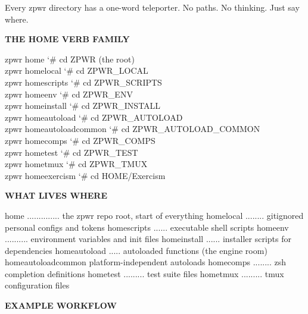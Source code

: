 \documentclass[11pt,a4paper,twoside]{book}
\begin{document}
Every zpwr directory has a one-word teleporter. No paths. No thinking. Just say where.


\vspace{12pt}
{\bfseries\color{neonyellow} THE \textbf{HOME} VERB FAMILY}\vspace{4pt}

\begin{codebox}
\color{neongreen}zpwr home                {\char`\#} cd ZPWR (the root)\\
\color{neongreen}zpwr homelocal           {\char`\#} cd ZPWR\_LOCAL\\
\color{neongreen}zpwr homescripts         {\char`\#} cd ZPWR\_SCRIPTS\\
\color{neongreen}zpwr homeenv             {\char`\#} cd ZPWR\_ENV\\
\color{neongreen}zpwr homeinstall         {\char`\#} cd ZPWR\_INSTALL\\
\color{neongreen}zpwr homeautoload        {\char`\#} cd ZPWR\_AUTOLOAD\\
\color{neongreen}zpwr homeautoloadcommon   {\char`\#} cd ZPWR\_AUTOLOAD\_COMMON\\
\color{neongreen}zpwr homecomps           {\char`\#} cd ZPWR\_COMPS\\
\color{neongreen}zpwr hometest            {\char`\#} cd ZPWR\_TEST\\
\color{neongreen}zpwr hometmux            {\char`\#} cd ZPWR\_TMUX\\
\color{neongreen}zpwr homeexercism        {\char`\#} cd HOME/Exercism\\
\end{codebox}


\vspace{12pt}
{\bfseries\color{neonyellow} WHAT LIVES WHERE}\vspace{4pt}

home .............. the zpwr repo root, start of everything homelocal ........ gitignored personal configs and tokens homescripts ...... executable shell scripts homeenv .......... environment variables and init files homeinstall ...... installer scripts for dependencies homeautoload ..... autoloaded functions (the engine room) homeautoloadcommon  platform-independent autoloads homecomps ........ zsh completion definitions hometest ......... test suite files hometmux ......... tmux configuration files


\vspace{12pt}
{\bfseries\color{neonyellow} EXAMPLE WORKFLOW}\vspace{4pt}
\end{document}
